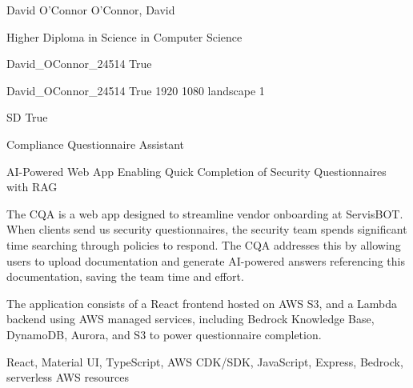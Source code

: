 \documentclass[twoside]{report}
\begin{document}
\begingroup{}\relax



\def\Key{David_OConnor_24514}

{David O'Connor}
{O'Connor, David}

{Higher Diploma in Science in Computer Science}

{David_OConnor_24514}
{True}

{David_OConnor_24514}
{True}
{1920}
{1080}
{landscape}
{1}

{SD}
{True}

{Compliance Questionnaire Assistant}

{AI-Powered Web App Enabling Quick Completion of Security Questionnaires with RAG}

{The CQA is a web app designed to streamline vendor onboarding at ServisBOT. When clients send us security questionnaires, the security team spends significant time searching through policies to respond. The CQA addresses this by allowing users to upload documentation and generate AI-powered answers referencing this documentation, saving the team time and effort.

The application consists of a React frontend hosted on AWS S3, and a Lambda backend using AWS managed services, including Bedrock Knowledge Base, DynamoDB, Aurora, and S3 to power questionnaire completion.}

{React, Material UI, TypeScript, AWS CDK/SDK, JavaScript, Express, Bedrock, serverless AWS resources}
\end{document}

